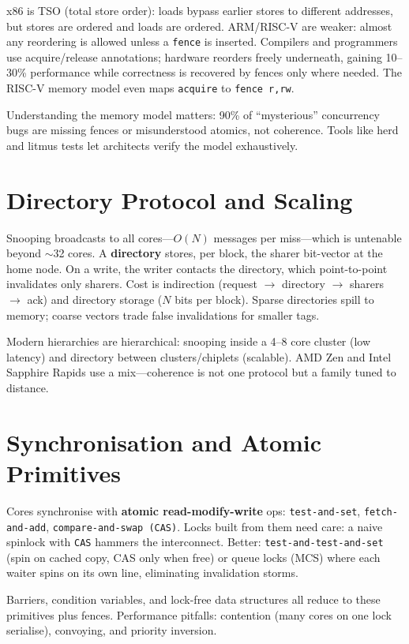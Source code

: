 x86 is TSO (total store order): loads bypass earlier stores to different addresses, but
stores are ordered and loads are ordered. ARM/RISC-V are weaker: almost any reordering
is allowed unless a \texttt{fence} is inserted. Compilers and programmers use
acquire/release annotations; hardware reorders freely underneath, gaining 10--30\%
performance while correctness is recovered by fences only where needed. The RISC-V
memory model even maps \texttt{acquire} to \texttt{fence r,rw}.

Understanding the memory model matters: 90\% of ``mysterious'' concurrency bugs are
missing fences or misunderstood atomics, not coherence. Tools like herd and litmus
tests let architects verify the model exhaustively.

\section{Directory Protocol and Scaling}
Snooping broadcasts to all cores---$O(N)$ messages per miss---which is untenable beyond
$\sim$32 cores. A \textbf{directory} stores, per block, the sharer bit-vector at the
home node. On a write, the writer contacts the directory, which point-to-point
invalidates only sharers. Cost is indirection (request $\to$ directory $\to$ sharers
$\to$ ack) and directory storage ($N$ bits per block). Sparse directories spill to
memory; coarse vectors trade false invalidations for smaller tags.

Modern hierarchies are hierarchical: snooping inside a 4--8 core cluster (low latency)
and directory between clusters/chiplets (scalable). AMD Zen and Intel Sapphire Rapids
use a mix---coherence is not one protocol but a family tuned to distance.

\section{Synchronisation and Atomic Primitives}
Cores synchronise with \textbf{atomic read-modify-write} ops: \texttt{test-and-set},
\texttt{fetch-and-add}, \texttt{compare-and-swap (CAS)}. Locks built from them need
care: a naive spinlock with \texttt{CAS} hammers the interconnect. Better:
\texttt{test-and-test-and-set} (spin on cached copy, CAS only when free) or queue locks
(MCS) where each waiter spins on its own line, eliminating invalidation storms.

Barriers, condition variables, and lock-free data structures all reduce to these
primitives plus fences. Performance pitfalls: contention (many cores on one lock
serialise), convoying, and priority inversion.


